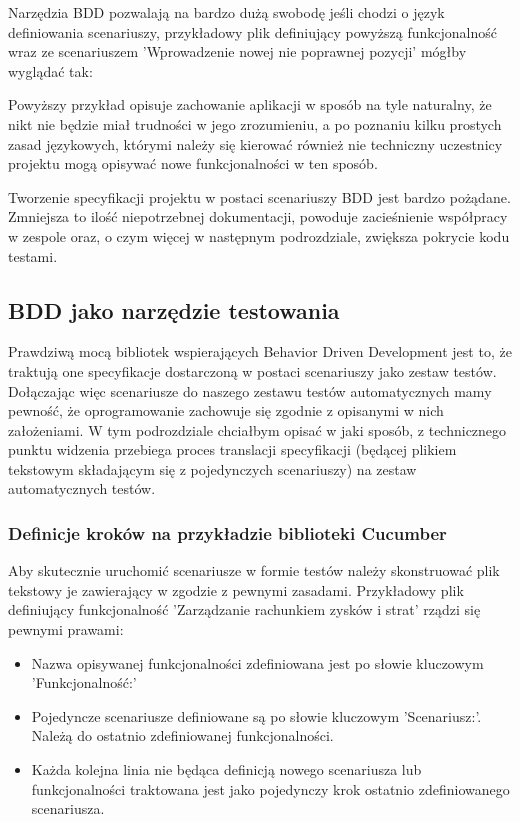       Narzędzia BDD pozwalają na bardzo dużą swobodę jeśli chodzi o język definiowania scenariuszy, przykładowy plik definiujący powyższą funkcjonalność wraz ze scenariuszem 'Wprowadzenie nowej nie poprawnej pozycji' mógłby wyglądać tak:
      


    Powyższy przykład opisuje zachowanie aplikacji w sposób na tyle naturalny, że nikt nie będzie miał trudności w jego zrozumieniu, a po poznaniu kilku prostych zasad językowych, którymi należy się kierować również nie techniczny uczestnicy projektu mogą opisywać nowe funkcjonalności w ten sposób.
    
    Tworzenie specyfikacji projektu w postaci scenariuszy BDD jest bardzo pożądane. Zmniejsza to ilość niepotrzebnej dokumentacji, powoduje zacieśnienie współpracy w zespole oraz, o czym więcej w następnym podrozdziale, zwiększa pokrycie kodu testami.
    
    \subsection{BDD jako narzędzie testowania}
      Prawdziwą mocą bibliotek wspierających Behavior Driven Development jest to, że traktują one specyfikacje dostarczoną w postaci scenariuszy jako zestaw testów. Dołączając więc scenariusze do naszego zestawu testów automatycznych mamy pewność, że oprogramowanie zachowuje się zgodnie z opisanymi w nich założeniami. W tym podrozdziale chciałbym opisać w jaki sposób, z technicznego punktu widzenia przebiega proces translacji specyfikacji (będącej plikiem tekstowym składającym się z pojedynczych scenariuszy) na zestaw automatycznych testów.
      \subsubsection{Definicje kroków na przykładzie biblioteki Cucumber}
        Aby skutecznie uruchomić scenariusze w formie testów należy skonstruować plik tekstowy je zawierający w zgodzie z pewnymi zasadami. Przykładowy plik definiujący funkcjonalność 'Zarządzanie rachunkiem zysków i strat' rządzi się pewnymi prawami:
        
        \begin{itemize}
          \item Nazwa opisywanej funkcjonalności zdefiniowana jest po słowie kluczowym 'Funkcjonalność:'
          \item Pojedyncze scenariusze definiowane są po słowie kluczowym 'Scenariusz:'. Należą do ostatnio zdefiniowanej funkcjonalności.
          \item Każda kolejna linia nie będąca definicją nowego scenariusza lub funkcjonalności traktowana jest jako pojedynczy krok ostatnio zdefiniowanego scenariusza.
        \end{itemize}
        

